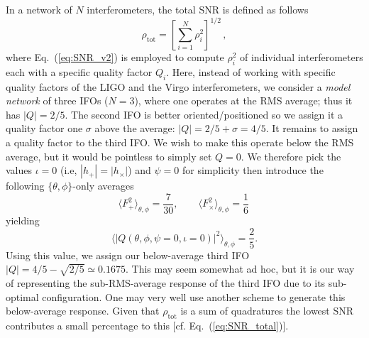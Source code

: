 \documentclass[prd,amsmath,amssymb,aps,floats,amsfonts,notitlepage,superscriptaddress,eqsecnum,nofootinbib,10pt]{revtex4-1}
\newcommand{\f}{\frac}
\newcommand{\be}{\begin{equation}}
\newcommand{\ee}{\end{equation}}
\begin{document}
In a network of $N$ interferometers, the total SNR is defined as follows \cite{Finn:2000hj}
%
\be
\rho_\text{tot} = \left[{\sum_{i=1}^N \rho^2_i}\right]^{1/2}\, , \label{eq:SNR_total}
\ee
%
where Eq.~(\ref{eq:SNR_v2}) is employed to compute $\rho^2_i$ of individual interferometers each with a specific quality factor $Q_i$.
Here, instead of working with specific quality factors of the LIGO and the Virgo interferometers, we consider
a \emph{model network} of three IFOs ($N=3$), where one operates at the RMS average; thus it has $|Q|=2/5$. 
The second IFO is better oriented/positioned so we assign it a quality
factor one $\sigma$ above the average: $|Q|=2/5+\sigma=4/5$.
It remains to assign a quality factor to the third IFO. We wish to make this operate below the RMS average, %
but it would be pointless to simply set $Q=0$. We therefore pick the values $\iota=0$ (i.e, $|h_+|=|h_\times|$)
and $\psi=0$ for simplicity %
then introduce the following $\{\theta,\phi\}$-only averages
%
\be
 \langle F_+^2\rangle_{\theta,\phi} = \frac{7}{30},\qquad \langle F_\times^2\rangle_{\theta,\phi} = \frac{1}{6}\, 
\ee
yielding
%
\be
\langle |Q(\theta,\phi,\psi=0,\iota=0)|^2 \rangle_{\theta,\phi} = \f{2}{5} \label{eq:RMS_th_phi}.
\ee
Using this value, we assign our below-average third IFO %
$|Q|=4/5-\sqrt{2/5}\simeq 0.1675$.
This may seem somewhat ad hoc, 
but it is our way of representing the sub-RMS-average response of the third IFO due to its sub-optimal configuration. 
One may very well use another scheme to generate this below-average response.
Given that $\rho_\text{tot}$ is a sum of quadratures the lowest SNR contributes a small percentage to this [cf. Eq.~(\ref{eq:SNR_total})].
\end{document}
